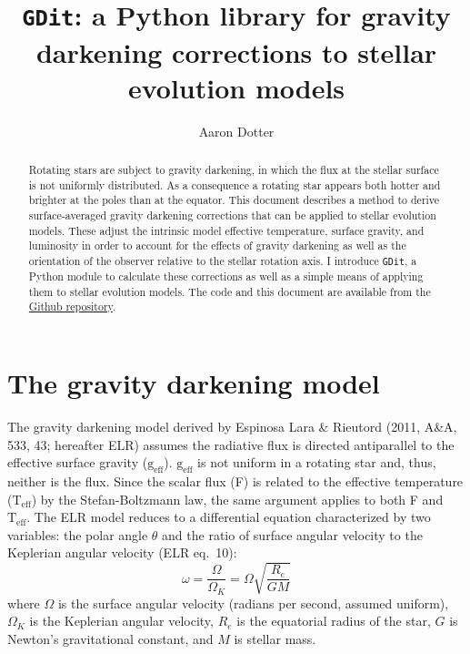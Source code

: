 \documentclass[12pt]{article}
\newcommand{\Teff}{\mathrm{T_{eff}}}
\newcommand{\geff}{\mathrm{g_{eff}}}
\begin{document}
\title{\texttt{GDit}: a Python library for gravity darkening corrections to stellar evolution models}
\author{Aaron Dotter}

\maketitle

\begin{abstract}
Rotating stars are subject to gravity darkening, in which the flux
at the stellar surface is not uniformly distributed. As a consequence
a rotating star appears both hotter and brighter at the poles than
at the equator. This document describes a method to derive surface-averaged
gravity darkening corrections that can be applied to stellar evolution models.
These adjust the intrinsic model effective temperature, surface gravity, and
luminosity in order to account for the effects of gravity darkening as well as
the orientation of the observer relative to the stellar rotation axis. I introduce
\texttt{GDit}, a Python module to calculate these corrections as well as a
simple means of applying them to stellar evolution models. The code and this document
are available from the \href{https://github.com/aarondotter/GDit}{Github repository}.
\end{abstract}


\section{The gravity darkening model}
The gravity darkening model derived by Espinosa Lara \& Rieutord (2011,
A\&A, 533, 43; hereafter ELR) assumes the radiative flux is directed
antiparallel to the effective surface gravity ($\geff$). $\geff$ is not
uniform in a rotating star and, thus, neither is the flux. Since the scalar
flux (F) is related to the effective temperature ($\Teff$) by the Stefan-Boltzmann
law, the same argument applies to both F and $\Teff$. The ELR model reduces to a
differential equation characterized by two variables: the polar angle $\theta$ and
the ratio of surface angular velocity to the Keplerian angular velocity (ELR eq.\ 10):
\begin{equation}
  \omega = \frac{\Omega}{\Omega_K} = \Omega \sqrt{ \frac{R_e}{GM} }
\end{equation}
where $\Omega$ is the surface angular velocity (radians per second,
assumed uniform), $\Omega_K$ is the Keplerian angular velocity,
$R_e$ is the equatorial radius of the star, $G$ is Newton's gravitational constant,
and $M$ is stellar mass. 
\end{document}
